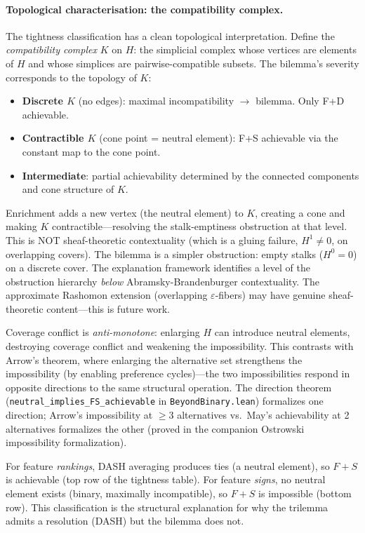 \documentclass{article}
\begin{document}
\paragraph{Topological characterisation: the compatibility complex.}
The tightness classification has a clean topological interpretation. Define the \emph{compatibility complex} $K$ on $H$: the simplicial complex whose vertices are elements of $H$ and whose simplices are pairwise-compatible subsets. The bilemma's severity corresponds to the topology of $K$:
\begin{itemize}
  \item \textbf{Discrete $K$} (no edges): maximal incompatibility $\to$ bilemma. Only F+D achievable.
  \item \textbf{Contractible $K$} (cone point = neutral element): F+S achievable via the constant map to the cone point.
  \item \textbf{Intermediate}: partial achievability determined by the connected components and cone structure of $K$.
\end{itemize}

Enrichment adds a new vertex (the neutral element) to $K$, creating a cone and making $K$ contractible---resolving the stalk-emptiness obstruction at that level. This is NOT sheaf-theoretic contextuality (which is a gluing failure, $H^1 \neq 0$, on overlapping covers). The bilemma is a simpler obstruction: empty stalks ($H^0 = 0$) on a discrete cover. The explanation framework identifies a level of the obstruction hierarchy \emph{below} Abramsky-Brandenburger contextuality. The approximate Rashomon extension (overlapping $\varepsilon$-fibers) may have genuine sheaf-theoretic content---this is future work.

Coverage conflict is \emph{anti-monotone}: enlarging $H$ can introduce neutral elements, destroying coverage conflict and weakening the impossibility.
This contrasts with Arrow's theorem, where enlarging the alternative set strengthens the impossibility (by enabling preference cycles)---the two impossibilities respond in opposite directions to the same structural operation.
The direction theorem (\texttt{neutral\_implies\_FS\_achievable} in \texttt{BeyondBinary.lean}) formalizes one direction; Arrow's impossibility at ${\geq}3$ alternatives vs.\ May's achievability at 2 alternatives formalizes the other (proved in the companion Ostrowski impossibility formalization).

For feature \emph{rankings}, DASH averaging produces ties (a neutral element), so $F{+}S$ is achievable (top row of the tightness table).
For feature \emph{signs}, no neutral element exists (binary, maximally incompatible), so $F{+}S$ is impossible (bottom row).
This classification is the structural explanation for why the trilemma admits a resolution (DASH) but the bilemma does not.
\end{document}
